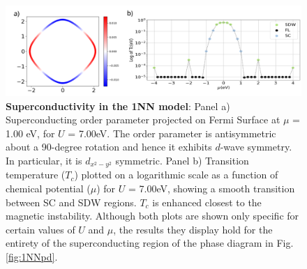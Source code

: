 \documentclass[12pt]{article}
\begin{document}
\begin{figure}[htbp]  %
    \centering
    \includegraphics[width=1.0\textwidth]{1NNSC.png}  %
    \caption{\textbf{Superconductivity in the 1NN model}:  
    Panel a) Superconducting order parameter projected on Fermi Surface at $\mu$ = 1.00 eV, 
    for $U$ = 7.00eV. The order parameter is antisymmetric about a 90-degree rotation and hence
    it exhibits $d$-wave symmetry. In particular, it is $d_{x^2-y^2}$ symmetric. 
    Panel b) Transition temperature ($T_c$) plotted on a logarithmic scale as a function of chemical potential ($\mu$) for $U$ = 7.00eV, showing
    a smooth transition between SC and SDW regions.
    $T_c$ is enhanced closest to the magnetic instability. 
    Although both plots are shown only specific for certain values of $U$ and $\mu$, the results they display hold for the entirety of
    the superconducting region of the phase diagram in Fig.\ref{fig:1NNpd}.  
    }
    \label{fig:1NNSC}
\end{figure}
\end{document}
